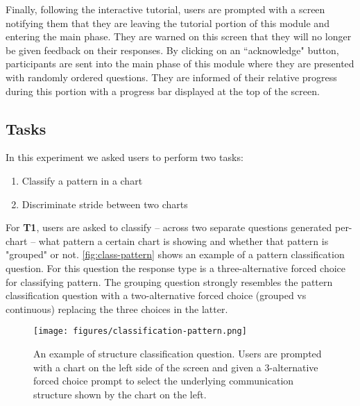     Finally, following the interactive tutorial, users are prompted with a screen notifying them that they are leaving the tutorial portion of this module and entering the main phase. They are warned on this screen that they will no longer be given feedback on their responses. By clicking on an ``acknowledge" button, participants are sent into the main phase of this module where they are presented with randomly ordered questions. They are informed of their relative progress during this portion with a progress bar displayed at the top of the screen.

\subsection{Tasks}
    
    In this experiment we asked users to perform two tasks:
    \vspace{-.5em}
    \begin{enumerate}[start=1, label={\bfseries T\arabic*}]
        \itemsep0em
        \item Classify a pattern in a chart
        \item Discriminate stride between two charts
    \end{enumerate}
    
    For \textbf{T1}, users are asked to classify -- across two separate questions generated per-chart -- what pattern a certain chart is showing and whether that pattern is "grouped" or not. \autoref{fig:class-pattern} shows an example of a pattern classification question. For this question the response type is a three-alternative forced choice for classifying pattern. The grouping question strongly resembles the pattern classification question with a two-alternative forced choice (grouped vs continuous) replacing the three choices in the latter.
    
    \begin{figure}
        \centering
        \texttt{[image: figures/classification-pattern.png]}
        \caption{An example of structure classification question. Users are prompted with a chart on the left side of the screen and given a 3-alternative forced choice prompt to select the underlying communication structure shown by the chart on the left.}
        \label{fig:class-pattern}
    \end{figure}
 
    
